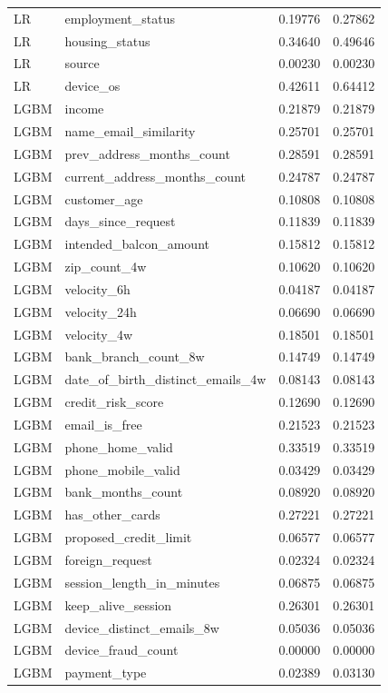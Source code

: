 \begin{longtable}{@{}llrr@{}}
LR & employment\_status & 0.19776 & 0.27862 \\
LR & housing\_status & 0.34640 & 0.49646 \\
LR & source & 0.00230 & 0.00230 \\
LR & device\_os & 0.42611 & 0.64412 \\
LGBM & income & 0.21879 & 0.21879 \\
LGBM & name\_email\_similarity & 0.25701 & 0.25701 \\
LGBM & prev\_address\_months\_count & 0.28591 & 0.28591 \\
LGBM & current\_address\_months\_count & 0.24787 & 0.24787 \\
LGBM & customer\_age & 0.10808 & 0.10808 \\
LGBM & days\_since\_request & 0.11839 & 0.11839 \\
LGBM & intended\_balcon\_amount & 0.15812 & 0.15812 \\
LGBM & zip\_count\_4w & 0.10620 & 0.10620 \\
LGBM & velocity\_6h & 0.04187 & 0.04187 \\
LGBM & velocity\_24h & 0.06690 & 0.06690 \\
LGBM & velocity\_4w & 0.18501 & 0.18501 \\
LGBM & bank\_branch\_count\_8w & 0.14749 & 0.14749 \\
LGBM & date\_of\_birth\_distinct\_emails\_4w & 0.08143 & 0.08143 \\
LGBM & credit\_risk\_score & 0.12690 & 0.12690 \\
LGBM & email\_is\_free & 0.21523 & 0.21523 \\
LGBM & phone\_home\_valid & 0.33519 & 0.33519 \\
LGBM & phone\_mobile\_valid & 0.03429 & 0.03429 \\
LGBM & bank\_months\_count & 0.08920 & 0.08920 \\
LGBM & has\_other\_cards & 0.27221 & 0.27221 \\
LGBM & proposed\_credit\_limit & 0.06577 & 0.06577 \\
LGBM & foreign\_request & 0.02324 & 0.02324 \\
LGBM & session\_length\_in\_minutes & 0.06875 & 0.06875 \\
LGBM & keep\_alive\_session & 0.26301 & 0.26301 \\
LGBM & device\_distinct\_emails\_8w & 0.05036 & 0.05036 \\
LGBM & device\_fraud\_count & 0.00000 & 0.00000 \\
LGBM & payment\_type & 0.02389 & 0.03130 \\

\end{longtable}

